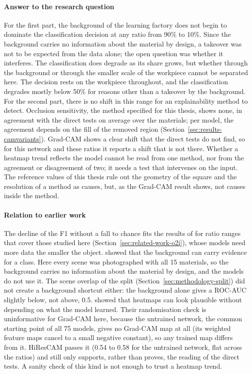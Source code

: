 \paragraph{Answer to the research question}
For the first part, the background of the learning factory does not begin to dominate
the classification decision at any ratio from 90\% to 10\%. Since the background
carries no information about the material by design, a takeover was not to be expected
from the data alone; the open question was whether it interferes. The classification
does degrade as its share grows, but whether through the background or through the
smaller scale of the workpiece cannot be separated here. The decision rests on the
workpiece throughout, and the classification degrades mostly below 50\% for reasons
other than a takeover by the background. For the second part, there is no shift in this
range for an explainability method to detect. Occlusion sensitivity, the method
specified for this thesis, shows none, in agreement with the direct tests on average over
the materials; per model, the agreement depends on the fill of the removed region
(Section~\ref{sec:results-camvariants}). Grad-CAM
shows a clear shift that the direct tests do not find, so for this network and these
ratios it reports a shift that is not there. Whether a heatmap trend reflects the model cannot be
read from one method, nor from the agreement or disagreement of two; it needs a test
that intervenes on the input. The reference values of this thesis rule out the geometry
of the square and the resolution of a method as causes, but, as the Grad-CAM result
shows, not causes inside the method.

\paragraph{Relation to earlier work}
The decline of the F1 without a fall to chance fits the results of \citet{pawlowski2019needles} for ratio ranges that cover those studied here
(Section~\ref{sec:related-work-o2i}), whose models need more data the smaller the
object. \citet{xiao2021noise} showed that the background can carry evidence
for a class. Here every scene was photographed with all 15 materials, so the background
carries no information about the material by design, and the models do not use it.
The scene overlap of the split (Section~\ref{sec:methodology-split}) did not create a
background shortcut either: the background alone gives a ROC-AUC slightly below, not
above, 0.5. \citet{adebayo2018sanity} showed that heatmaps can look
plausible without depending on what the model learned. Their randomisation check is
uninformative for Grad-CAM here, because the untrained network, the common starting point
of all 75 models, gives no Grad-CAM map at all (its weighted feature maps cancel to a
small negative constant), so any trained map differs from it.
HiResCAM passes it (0.54 to 0.58 for the untrained network, flat across the ratios) and
still only supports, rather than proves, the reading of the direct tests. A sanity check
of this kind is not enough to trust a heatmap trend.

